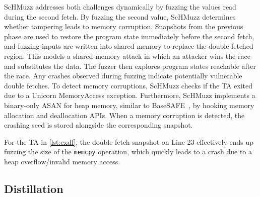 \documentclass[conference]{IEEEtran}
\newcommand{\sysname}{ScHMuzz\xspace}
\newcommand{\stageone}{Exploration\xspace}
\newcommand{\stagetwo}{Fetch-Anchored Fuzzing\xspace}
\newcommand{\stagethree}{Distillation\xspace}
\begin{document}
\sysname addresses both challenges dynamically by fuzzing the values read during the second fetch. 
By fuzzing the second value, 
\sysname determines whether tampering leads to memory corruption. Snapshots from the previous phase 
are used to restore the program state immediately before the second fetch, and fuzzing inputs are 
written into shared memory to replace the double-fetched region. This models a shared-memory attack 
in which an attacker wins the race and substitutes the data. The fuzzer then explores program states 
reachable after the race. Any crashes 
observed during fuzzing indicate potentially vulnerable double fetches. 
To detect memory corruptions, \sysname checks if 
the TA exited due to a Unicorn MemoryAccess exception. Furthermore, \sysname implements a binary-only ASAN for heap memory, 
similar to BaseSAFE~\cite{basesafe}, by hooking memory allocation and deallocation APIs. When a memory corruption is detected, 
the crashing seed is stored alongside the corresponding snapshot. 

For the TA in \autoref{lst:exdf}, the double fetch snapshot on Line 23 
effectively ends up fuzzing the size of the \texttt{memcpy} operation, which 
quickly leads to a crash due to a heap overflow/invalid memory access.


\subsection{\stagethree}
\end{document}
